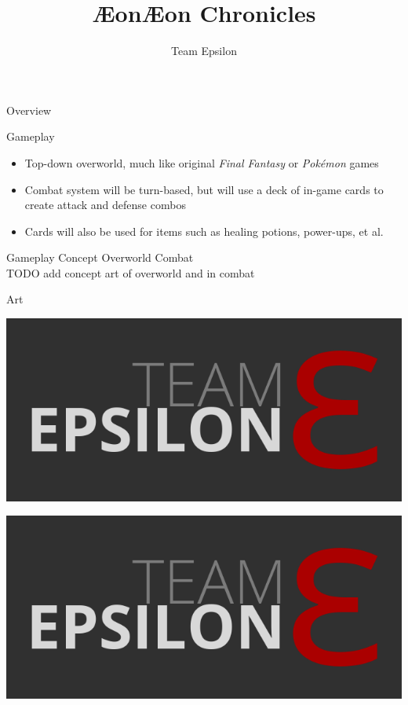 \documentclass{teamepsilon}
\title{\AE on}
\title{{\AE}on Chronicles}
\author{Team Epsilon}
\institute{Colorado School of Mines}
\begin{document}
\begin{frame}{Overview}

\end{frame}

\begin{frame}{Gameplay}
    \begin{itemize}
        \item Top-down overworld, much like original \textit{Final Fantasy}
        or \textit{Pok\'emon} games
        \item Combat system will be turn-based, but will use a deck of in-game
        cards to create attack and defense combos
        \item Cards will also be used for items such as healing potions,
        power-ups, et al.
    \end{itemize}
\end{frame}

\begin{frame}{Gameplay Concept}
Overworld \hfill Combat \\
TODO add concept art of overworld and in combat
\end{frame}

\begin{frame}{Art}

\begin{minipage}{0.65\textwidth}
\includegraphics[width=\textwidth]{../logo/team-epsilon.png}
\end{minipage}%

\begin{minipage}{0.35\textwidth}
\includegraphics[width=\textwidth]{../logo/team-epsilon.png}
\end{minipage}

\end{frame}
\end{document}
